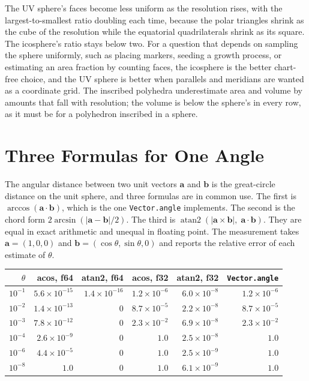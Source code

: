 The UV sphere's faces become less uniform as the resolution rises, with the largest-to-smallest ratio doubling each time, because the polar triangles shrink as the cube of the resolution while the equatorial quadrilaterals shrink as its square. The icosphere's ratio stays below two. For a question that depends on sampling the sphere uniformly, such as placing markers, seeding a growth process, or estimating an area fraction by counting faces, the icosphere is the better chart-free choice, and the UV sphere is better when parallels and meridians are wanted as a coordinate grid. The inscribed polyhedra underestimate area and volume by amounts that fall with resolution; the volume is below the sphere's in every row, as it must be for a polyhedron inscribed in a sphere.

\section{Three Formulas for One Angle}

The angular distance between two unit vectors $\mathbf a$ and $\mathbf b$ is the great-circle distance on the unit sphere, and three formulas are in common use. The first is $\arccos(\mathbf a\cdot\mathbf b)$, which is the one \texttt{Vector.angle} implements. The second is the chord form $2\arcsin(|\mathbf a-\mathbf b|/2)$. The third is $\operatorname{atan2}(|\mathbf a\times\mathbf b|,\;\mathbf a\cdot\mathbf b)$. They are equal in exact arithmetic and unequal in floating point. The measurement takes $\mathbf a=(1,0,0)$ and $\mathbf b=(\cos\theta,\sin\theta,0)$ and reports the relative error of each estimate of $\theta$.

\begin{center}
\begin{tabular}{rrrrrr}
\toprule
$\theta$ & acos, f64 & atan2, f64 & acos, f32 & atan2, f32 & \texttt{Vector.angle}\\
\midrule
$10^{-1}$ & $5.6\times10^{-15}$ & $1.4\times10^{-16}$ & $1.2\times10^{-6}$ & $6.0\times10^{-8}$ & $1.2\times10^{-6}$\\
$10^{-2}$ & $1.4\times10^{-13}$ & $0$ & $8.7\times10^{-5}$ & $2.2\times10^{-8}$ & $8.7\times10^{-5}$\\
$10^{-3}$ & $7.8\times10^{-12}$ & $0$ & $2.3\times10^{-2}$ & $6.9\times10^{-8}$ & $2.3\times10^{-2}$\\
$10^{-4}$ & $2.6\times10^{-9}$ & $0$ & $1.0$ & $2.5\times10^{-8}$ & $1.0$\\
$10^{-6}$ & $4.4\times10^{-5}$ & $0$ & $1.0$ & $2.5\times10^{-9}$ & $1.0$\\
$10^{-8}$ & $1.0$ & $0$ & $1.0$ & $6.1\times10^{-9}$ & $1.0$\\
\bottomrule
\end{tabular}
\end{center}

